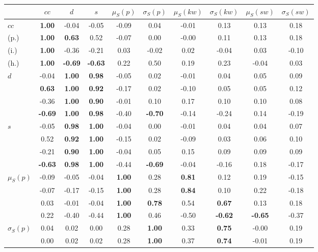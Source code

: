 \begin{table*}[h!]
\begin{center}
\begin{tabular}{| l || c | c | c | c | c | c | c | c | c |}\hline
 & $cc$ & $d$ & $s$ & $\mu_S(p)$ & $\sigma_S(p)$ & $\mu_S(kw)$ & $\sigma_S(kw)$ & $\mu_S(sw)$ & $\sigma_S(sw)$ \\\hline\hline
$cc$ & {\bf 1.00} & -0.04 & -0.05 & -0.09 & 0.04 & -0.01 & 0.13 & 0.13 & 0.18 \\
(p.) & {\bf 1.00} & {\bf 0.63} & 0.52 & -0.07 & 0.00 & -0.00 & 0.11 & 0.13 & 0.18 \\
(i.) & {\bf 1.00} & -0.36 & -0.21 & 0.03 & -0.02 & 0.02 & -0.04 & 0.03 & -0.10 \\
(h.) & {\bf 1.00} & {\bf -0.69} & {\bf -0.63} & 0.22 & 0.50 & 0.19 & 0.23 & -0.04 & 0.03 \\\hline
$d$ & -0.04 & {\bf 1.00} & {\bf 0.98} & -0.05 & 0.02 & -0.01 & 0.04 & 0.05 & 0.09 \\
 & {\bf 0.63} & {\bf 1.00} & {\bf 0.92} & -0.17 & 0.02 & -0.10 & 0.05 & 0.05 & 0.12 \\
 & -0.36 & {\bf 1.00} & {\bf 0.90} & -0.01 & 0.10 & 0.17 & 0.10 & 0.10 & 0.08 \\
 & {\bf -0.69} & {\bf 1.00} & {\bf 0.98} & -0.40 & {\bf -0.70} & -0.14 & -0.24 & 0.14 & -0.19 \\\hline
$s$ & -0.05 & {\bf 0.98} & {\bf 1.00} & -0.04 & 0.00 & -0.01 & 0.04 & 0.04 & 0.07 \\
 & 0.52 & {\bf 0.92} & {\bf 1.00} & -0.15 & 0.02 & -0.09 & 0.03 & 0.06 & 0.10 \\
 & -0.21 & {\bf 0.90} & {\bf 1.00} & -0.04 & 0.05 & 0.15 & 0.09 & 0.09 & 0.09 \\
 & {\bf -0.63} & {\bf 0.98} & {\bf 1.00} & -0.44 & {\bf -0.69} & -0.04 & -0.16 & 0.18 & -0.17 \\\hline
$\mu_S(p)$ & -0.09 & -0.05 & -0.04 & {\bf 1.00} & 0.28 & {\bf 0.81} & 0.12 & 0.19 & -0.15 \\
 & -0.07 & -0.17 & -0.15 & {\bf 1.00} & 0.28 & {\bf 0.84} & 0.10 & 0.22 & -0.18 \\
 & 0.03 & -0.01 & -0.04 & {\bf 1.00} & {\bf 0.78} & 0.54 & {\bf 0.67} & 0.13 & 0.18 \\
 & 0.22 & -0.40 & -0.44 & {\bf 1.00} & 0.46 & -0.50 & {\bf -0.62} & {\bf -0.65} & -0.37 \\\hline
$\sigma_S(p)$ & 0.04 & 0.02 & 0.00 & 0.28 & {\bf 1.00} & 0.33 & {\bf 0.75} & -0.00 & 0.19 \\
 & 0.00 & 0.02 & 0.02 & 0.28 & {\bf 1.00} & 0.37 & {\bf 0.74} & -0.01 & 0.19 \\

\end{tabular}
\end{center}
\end{table*}
